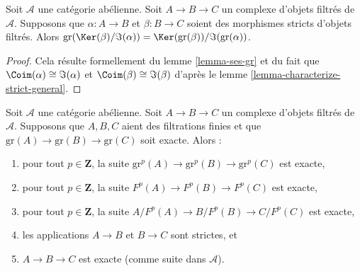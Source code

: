 \begin{lemma}
\label{lemma-filtered-complex}
Soit $\mathcal{A}$ une catégorie abélienne. Soit $A \to B \to C$ un complexe
d'objets filtrés de $\mathcal{A}$. Supposons que $\alpha : A \to B$ et
$\beta : B \to C$ soient des morphismes stricts d'objets filtrés. Alors
$\text{gr}(\Ker(\beta)/\Im(\alpha)) =
\Ker(\text{gr}(\beta))/\Im(\text{gr}(\alpha))$.
\end{lemma}

\begin{proof}
Cela résulte formellement du
lemme \ref{lemma-ses-gr}
et du fait que
$\Coim(\alpha) \cong \Im(\alpha)$ et
$\Coim(\beta) \cong \Im(\beta)$ d'après le
lemme \ref{lemma-characterize-strict-general}.
\end{proof}

\begin{lemma}
\label{lemma-filtered-acyclic}
Soit $\mathcal{A}$ une catégorie abélienne.
Soit $A \to B \to C$ un complexe d'objets filtrés de $\mathcal{A}$.
Supposons que $A, B, C$ aient des filtrations finies et que
$\text{gr}(A) \to \text{gr}(B) \to \text{gr}(C)$ soit exacte.
Alors :
\begin{enumerate}
\item pour tout $p \in \mathbf{Z}$, la suite
$\text{gr}^p(A) \to \text{gr}^p(B) \to \text{gr}^p(C)$ est exacte,
\item pour tout $p \in \mathbf{Z}$, la suite
$F^p(A) \to F^p(B) \to F^p(C)$ est exacte,
\item pour tout $p \in \mathbf{Z}$, la suite
$A/F^p(A) \to B/F^p(B) \to C/F^p(C)$ est exacte,
\item les applications $A \to B$ et $B \to C$ sont strictes, et
\item $A \to B \to C$ est exacte (comme suite dans $\mathcal{A}$).
\end{enumerate}
\end{lemma}


